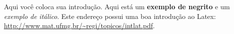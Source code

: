 Aqui você coloca sua introdução. Aqui está um \textbf{exemplo de negrito} e um \textit{exemplo de itálico}.
Este endereço possui uma boa introdução ao Latex: \url{http://www.mat.ufmg.br/~regi/topicos/intlat.pdf}.
